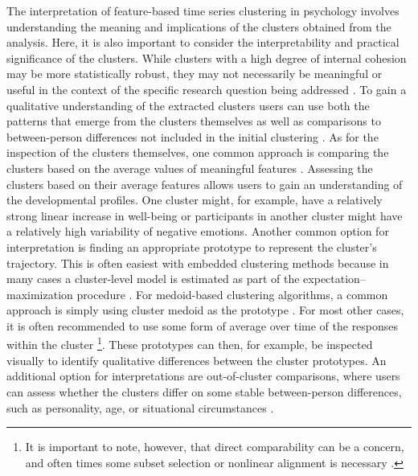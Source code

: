 \documentclass[man, 12pt, a4paper, mask, floatsintext]{apa7}
\theoremstyle{break}
\theoremstyle{plain}
\begin{document}
The interpretation of feature-based time series clustering in psychology involves understanding the meaning and implications of the clusters obtained from the analysis. Here, it is also important to consider the interpretability and practical significance of the clusters. While clusters with a high degree of internal cohesion may be more statistically robust, they may not necessarily be meaningful or useful in the context of the specific research question being addressed \citep{kaufman1990}. To gain a qualitative understanding of the extracted clusters users can use both the patterns that emerge from the clusters themselves as well as comparisons to between-person differences not included in the initial clustering \citep[e.g.,][]{monden2022}. As for the inspection of the clusters themselves, one common approach is comparing the clusters based on the average values of meaningful features \citep{Kennedy2021}. Assessing the clusters based on their average features allows users to gain an understanding of the developmental profiles. One cluster might, for example, have a relatively strong linear increase in well-being or participants in another cluster might have a relatively high variability of negative emotions. Another common option for interpretation is finding an appropriate prototype to represent the cluster's trajectory. This is often easiest with embedded clustering methods because in many cases a cluster-level model is estimated as part of the expectation–maximization procedure \citep[e.g.,][]{denteuling2021}. For medoid-based clustering algorithms, a common approach is simply using cluster medoid as the prototype \citep{kaufman1990}. For most other cases, it is often recommended to use some form of average over time of the responses within the cluster \citep{niennattrakul2007}\footnote{It is important to note, however, that direct comparability can be a concern, and often times some subset selection or nonlinear alignment is necessary \citep[e.g.,][]{gupta1996}.}. These prototypes can then, for example, be inspected visually to identify qualitative differences between the cluster prototypes. An additional option for interpretations are out-of-cluster comparisons, where users can assess whether the clusters differ on some stable between-person differences, such as personality, age, or situational circumstances \citep[e.g.,][]{monden2022}.
\end{document}
